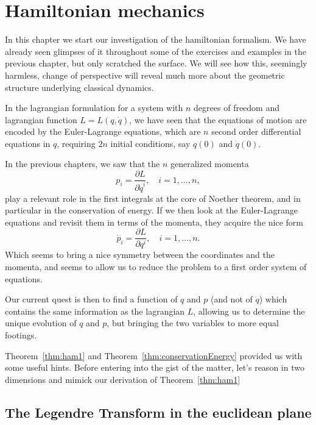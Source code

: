 \documentclass[english,fontsize=11pt,paper=a5,oneside]{scrbook}
\theoremstyle{definition}
\begin{document}
\chapter{Hamiltonian mechanics}

In this chapter we start our investigation of the hamiltonian formalism.
We have already seen glimpses of it throughout some of the exercises and examples in the previous chapter, but only scratched the surface.
We will see how this, seemingly harmless, change of perspective will reveal much more about the geometric structure underlying classical dynamics.

In the lagrangian formulation for a system with $n$ degrees of freedom and lagrangian function $L=L(q, \dot q)$, we have seen that the equations of motion are encoded by the Euler-Lagrange equations, which are $n$ second order differential equations in $q$, requiring $2n$ initial conditions, say $q(0)$ and $\dot q(0)$.

In the previous chapters, we saw that the $n$ generalized momenta
\begin{equation}
  p_i = \frac{\partial L}{\partial \dot q^i}, \quad i=1,\ldots,n,
\end{equation}
play a relevant role in the first integrals at the core of Noether theorem, and in particular in the conservation of energy.
If we then look at the Euler-Lagrange equations and revisit them in terms of the momenta, they acquire the nice form
\begin{equation}
  \dot p_i = \frac{\partial L}{\partial q^i}, \quad i=1,\ldots,n.
\end{equation}
Which seems to bring a nice symmetry between the coordinates and the momenta, and seems to allow us to reduce the problem to a first order system of equations.

Our current quest is then to find a function of $q$ and $p$ (and not of $\dot q$) which contains the same information as the lagrangian $L$, allowing us to determine the unique evolution of $q$ and $p$, but bringing the two variables to more equal footings.

Theorem~\ref{thm:ham1} and Theorem~\ref{thm:conservationEnergy} provided us with some useful hints.
Before entering into the gist of the matter, let's reason in two dimensions and mimick our derivation of Theorem~\ref{thm:ham1}

\section{The Legendre Transform in the euclidean plane}
\end{document}
